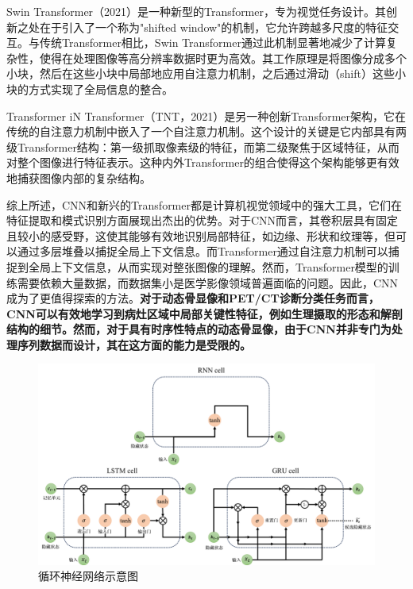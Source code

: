 Swin Transformer\cite{liu2021swin}（2021）是一种新型的Transformer，专为视觉任务设计。其创新之处在于引入了一个称为"shifted window"的机制，它允许跨越多尺度的特征交互。与传统Transformer相比，Swin Transformer通过此机制显著地减少了计算复杂性，使得在处理图像等高分辨率数据时更为高效。其工作原理是将图像分成多个小块，然后在这些小块中局部地应用自注意力机制，之后通过滑动（shift）这些小块的方式实现了全局信息的整合。

Transformer iN Transformer\cite{han2021transformer}（TNT，2021）是另一种创新Transformer架构，它在传统的自注意力机制中嵌入了一个自注意力机制。这个设计的关键是它内部具有两级Transformer结构：第一级抓取像素级的特征，而第二级聚焦于区域特征，从而对整个图像进行特征表示。这种内外Transformer的组合使得这个架构能够更有效地捕获图像内部的复杂结构。

综上所述，CNN和新兴的Transformer都是计算机视觉领域中的强大工具，它们在特征提取和模式识别方面展现出杰出的优势。对于CNN而言，其卷积层具有固定且较小的感受野，这使其能够有效地识别局部特征，如边缘、形状和纹理等，但可以通过多层堆叠以捕捉全局上下文信息。而Transformer通过自注意力机制可以捕捉到全局上下文信息，从而实现对整张图像的理解。然而，Transformer模型的训练需要依赖大量数据，而数据集小是医学影像领域普遍面临的问题。因此，CNN成为了更值得探索的方法。\textbf{对于动态骨显像和PET/CT诊断分类任务而言，CNN可以有效地学习到病灶区域中局部关键性特征，例如生理摄取的形态和解剖结构的细节。然而，对于具有时序性特点的动态骨显像，由于CNN并非专门为处理序列数据而设计，其在这方面的能力是受限的。}

\begin{figure}[htbp]
    \centering
    \includegraphics[width=\textwidth]{figures/chap02_rnn.png}
    \caption{循环神经网络示意图}
    \label{fig:chap02_rnn}
\end{figure}

